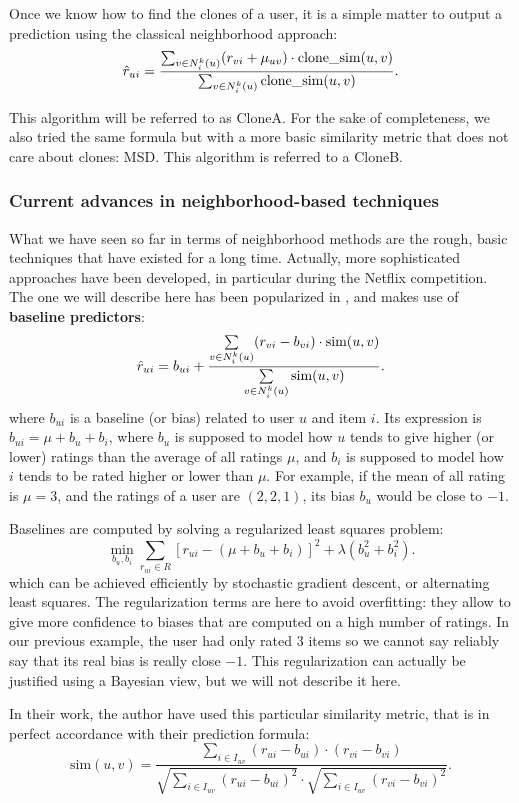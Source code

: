 \noindent
Once we know how to find the clones of a user, it is a simple matter to output
a prediction using the classical neighborhood approach:
$$\hat{r}_{ui} = \frac{\sum_{v \in N_i^k(u)} (r_{vi} + \mu_{uv}) \cdot \text{clone\_sim}(u,
v)}{\sum_{v \in N_i^k(u)} \text{clone\_sim}(u, v)}.$$

This algorithm will be referred to as CloneA. For the sake of completeness,
we also tried the same formula but with a more basic similarity metric that
does not care about clones: MSD. This algorithm is referred to a CloneB.

\subsubsection{Current advances in neighborhood-based techniques}

What we have seen so far in terms of neighborhood methods are the rough, basic
techniques that have existed for a long time. Actually, more sophisticated
approaches have been developed, in particular during the Netflix competition.
The one we will describe here has been popularized in \cite{BelKorSIGKDD2007},
and makes use of \textbf{baseline predictors}:
$$\hat{r}_{ui} = b_{ui} + \frac{\sum\limits_{v \in N_i^k(u)} (r_{vi} - b_{vi})
\cdot \text{sim}(u, v)} {\sum\limits_{v \in N_i^k(u)}\text{sim}(u, v)}.$$
where $b_{ui}$ is a baseline (or bias) related to user $u$ and item $i$. Its
expression is $b_{ui} = \mu + b_u + b_i$, where $b_u$ is supposed to model how
$u$ tends to give higher (or lower) ratings than the average of all ratings
$\mu$, and $b_i$ is supposed to model how $i$ tends to be rated higher or lower
than $\mu$. For example, if the mean of all rating is $\mu = 3$, and the
ratings of a user are $(2, 2, 1)$, its bias $b_u$ would be close to $-1$.

Baselines are computed by solving a regularized least squares problem:
$$\min_{b_u, b_i} \sum_{r_{ui} \in R} \left[r_{ui} - (\mu + b_u + b_i)\right]^2
+ \lambda \left(b_u^2 + b_i^2 \right).$$
which can be achieved efficiently by stochastic gradient descent, or
alternating least squares. The regularization terms are here to avoid
overfitting: they allow to give more confidence to biases that are computed on
a high number of ratings. In our previous example, the user had only rated $3$
items so we cannot say reliably say that its real bias is really close $-1$.
This regularization can actually be justified using a Bayesian view, but we
will not describe it here.

In their work, the author have used this particular similarity metric, that is
in perfect accordance with their prediction formula:
$$\text{sim}(u, v) = \frac
{ \sum\limits_{i \in I_{uv}} (r_{ui} -  b_{ui}) \cdot (r_{vi} - b_{vi})}
{\sqrt{\sum\limits_{i \in I_{uv}} (r_{ui} -  b_{ui})^2} \cdot
\sqrt{\sum\limits_{i \in I_{uv}} (r_{vi} -  b_{vi})^2}}.$$

